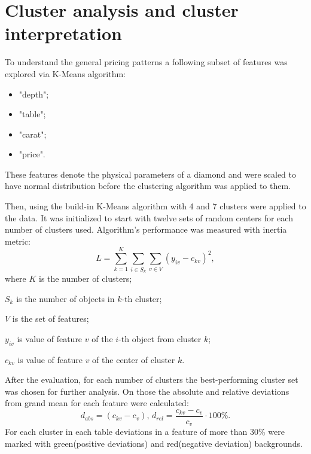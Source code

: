 \documentclass[14pt,a4paper]{extarticle}
\begin{document}
	\section{Cluster analysis and cluster interpretation}
	
	To understand the general pricing patterns a following subset of features was explored via K-Means algorithm:
	\begin{itemize}
		\item "depth";
		\item "table";
		\item "carat";
		\item "price".
	\end{itemize}
	These features denote the physical parameters of a diamond and were scaled to have normal distribution before the clustering algorithm was applied to them. 
	
	Then, using the build-in K-Means algorithm with 4 and 7 clusters were applied to the data. It was initialized to start with twelve sets of random centers for each number of clusters used. Algorithm's performance was measured with inertia metric:
	\[L = \sum\limits_{k=1}^{K}\sum\limits_{i\in S_{k}}\sum\limits_{v\in V} \left(y_{iv} - c_{kv}\right)^2,\]
	where $K$ is the number of clusters;
	
	$S_k$ is the number of objects in $k$-th cluster;
	
	$V$ is the set of features;
	
	$y_{iv}$ is value of feature $v$ of the $i$-th object from cluster $k$;
	
	$c_{kv}$ is value of feature $v$ of the center of cluster $k$.
	
	After the evaluation, for each number of clusters the best-performing cluster set was chosen for further analysis. On those the absolute and relative deviations from grand mean for each feature were calculated: 
	\[d_{abs}=(c_{kv}-c_{v}),\, d_{rel}=\dfrac{c_{kv}-c_{v}}{c_v}\cdot100\%.\]
	For each cluster in each table deviations in a feature of more than 30\% were marked with green(positive deviations) and red(negative deviation) backgrounds. 
	
\end{document}
